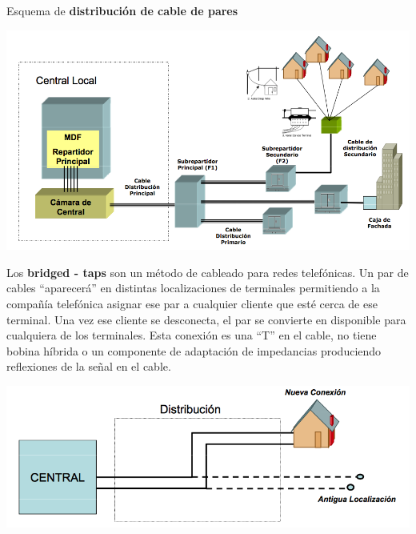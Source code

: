 \documentclass[10pt,portrait, twocolumn]{article}
\makeatletter
\renewcommand{\subsubsection}{\@startsection{subsubsection}{3}{0mm}%
                                {-1ex plus -.5ex minus -.2ex}%
                                {1ex plus .2ex}%
                                {\normalfont\small\bfseries}}
\makeatother
\begin{document}
Esquema de \textbf{distribución de cable de pares}

	\begin{center}
		\includegraphics[scale=0.2]{images/Distribucion}
	\end{center}	


Los \textbf{bridged - taps} son un método de cableado para redes telefónicas. Un par de cables ``aparecerá'' en distintas localizaciones de terminales permitiendo a la compañía telefónica asignar ese par a cualquier cliente que esté cerca de ese terminal. Una vez ese cliente se desconecta, el par se convierte en disponible para cualquiera de los terminales. Esta conexión es una ``T'' en el cable, no tiene bobina híbrida o un componente de adaptación de impedancias produciendo reflexiones de la señal en el cable.

	\begin{center}
		\includegraphics[scale=0.2]{images/Taps}
	\end{center}

\end{document}
